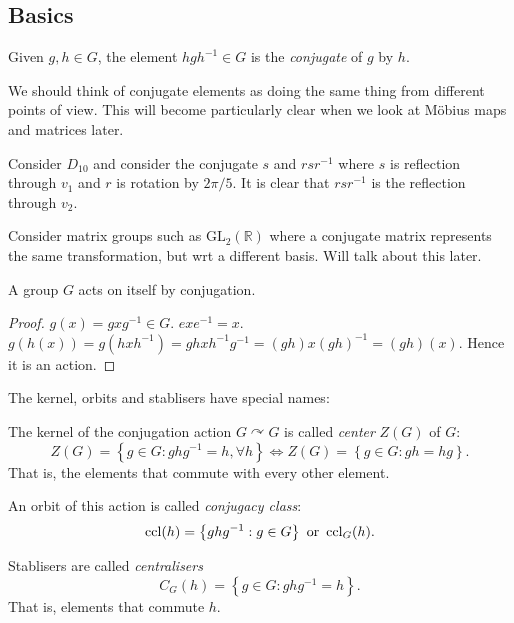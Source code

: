 \documentclass[10pt]{article}
\begin{document}
      \subsection{Basics}
      \begin{definition}
          Given $g,h\in G$, the element $hgh^{-1}\in G$ is the \textit{conjugate} of $g$ by $h$.
      \end{definition}
      We should think of conjugate elements as doing the same thing from different points of view. This will become particularly clear when we look at M\"{o}bius maps and matrices later.
      \begin{example}
          Consider $D_{10}$ and consider the conjugate $s$ and $rsr^{-1}$ where $s$ is reflection through $v_1$ and $r$ is rotation by $2\pi/5 $. It is clear that $rsr^{-1}$ is the reflection through $v_2$. 
      \end{example}
      \begin{example}
          Consider matrix groups such as $ \mathrm{GL}_2(\mathbb{R}) $ where a conjugate matrix represents the same transformation, but wrt a different basis. Will talk about this later.
      \end{example}
      \begin{proposition}\label{prop:5.18}
          A group $G$ acts on itself by conjugation.
      \end{proposition}
      \begin{proof}
          $g(x)=gxg^{-1}\in G$. $exe^{-1}=x$. $ g(h(x))=g(hxh^{-1})=ghxh^{-1}g^{-1}=(gh)x(gh)^{-1}=(gh)(x) $. Hence it is an action. 
      \end{proof}
      The kernel, orbits and stablisers have special names:
      \begin{definition}
          The kernel of the conjugation action $ G \curvearrowright G $ is called \textit{center} $ Z(G) $ of $G$:
          \[
              Z(G)=\left\{ g\in G: ghg^{-1}=h, \forall h \right\} \Longleftrightarrow Z(G)=\left\{ g\in G: gh=hg \right\}
          .\] 
          That is, the elements that commute with every other element.

          An orbit of this action is called \textit{conjugacy class}:
          \[
              \operatorname{ccl}(h)=\left\{ ghg^{-1}:g\in G \right\} \text{ or } \operatorname{ccl}_G(h)
          .\]

          Stablisers are called \textit{centralisers}
          \[
              C_G(h)=\left\{ g\in G:ghg^{-1}=h \right\}
          .\]
          That is, elements that commute $h$.
      \end{definition}
\end{document}
